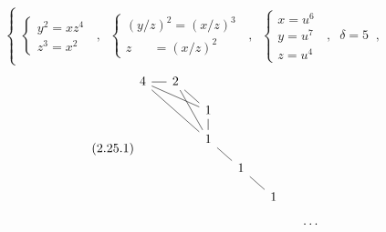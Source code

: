 \begin{equation}\tag{2.25.1}
\left\{
\begin{array}{l}
\left\{\begin{array}{l} y^{2} = xz^{4} \\ z^{3} = x^{2} \end{array}\right. \;\;,\;\;
\left\{\begin{array}{l} (y/z)^{2} = (x/z)^{3} \\ z \;\;\;\;\;\; = (x/z)^{2} \end{array}\right. \;\;,\;\;
\left\{\begin{array}{l} x = u^{6} \\ y = u^{7} \\ z = u^{4} \end{array}\right. \;\;,\;\; \delta = 5 \;\;,
\end{array}
\right.
\end{equation}
\begin{equation}\tag{2.25.1}
\begin{tikzcd}[column sep=small, row sep=small]
4 \arrow[r, dash] \arrow[rrd, dash] \arrow[rrdd, dash] & 2 \arrow[rd, dash] \arrow[rdd, dash] & & & & \\
& & 1 \arrow[d, dash] & & & \\
& & 1 \arrow[rd, dash] & & & \\
& & & 1 \arrow[rd, dash] & & \\
& & & & 1 & \\
& & & & & \cdots
\end{tikzcd}
\end{equation}
